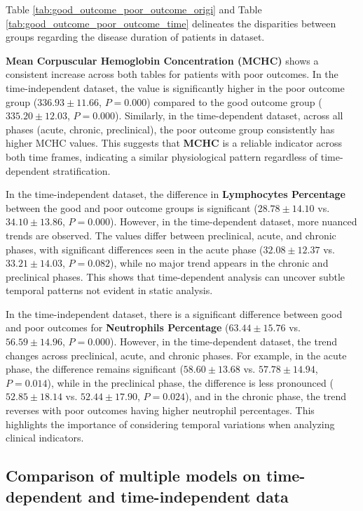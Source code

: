 \documentclass[preprint,12pt,authoryear]{elsarticle}
\begin{document}
Table \ref{tab:good_outcome_poor_outcome_origi} and Table \ref{tab:good_outcome_poor_outcome_time} delineates the disparities between groups regarding the disease duration of patients in dataset. 

\textbf{Mean Corpuscular Hemoglobin Concentration (MCHC)} shows a consistent increase across both tables for patients with poor outcomes. In the time-independent dataset, the value is significantly higher in the poor outcome group ($336.93 \pm 11.66$, $P = 0.000$) compared to the good outcome group ($335.20 \pm 12.03$, $P = 0.000$). Similarly, in the time-dependent dataset, across all phases (acute, chronic, preclinical), the poor outcome group consistently has higher MCHC values. This suggests that \textbf{MCHC} is a reliable indicator across both time frames, indicating a similar physiological pattern regardless of time-dependent stratification.

In the time-independent dataset, the difference in \textbf{Lymphocytes Percentage} between the good and poor outcome groups is significant ($28.78 \pm 14.10$ vs. $34.10 \pm 13.86$, $P = 0.000$). However, in the time-dependent dataset, more nuanced trends are observed. The values differ between preclinical, acute, and chronic phases, with significant differences seen in the acute phase ($32.08 \pm 12.37$ vs. $33.21 \pm 14.03$, $P = 0.082$), while no major trend appears in the chronic and preclinical phases. This shows that time-dependent analysis can uncover subtle temporal patterns not evident in static analysis.

In the time-independent dataset, there is a significant difference between good and poor outcomes for \textbf{Neutrophils Percentage} ($63.44 \pm 15.76$ vs. $56.59 \pm 14.96$, $P = 0.000$). However, in the time-dependent dataset, the trend changes across preclinical, acute, and chronic phases. For example, in the acute phase, the difference remains significant ($58.60 \pm 13.68$ vs. $57.78 \pm 14.94$, $P = 0.014$), while in the preclinical phase, the difference is less pronounced ($52.85 \pm 18.14$ vs. $52.44 \pm 17.90$, $P = 0.024$), and in the chronic phase, the trend reverses with poor outcomes having higher neutrophil percentages. This highlights the importance of considering temporal variations when analyzing clinical indicators.




\subsection{Comparison of multiple models on time-dependent and time-independent data}\label{ModelComparison}
\end{document}
